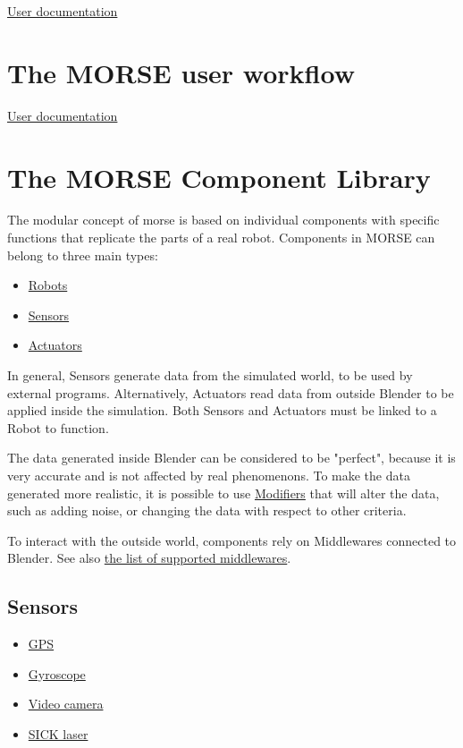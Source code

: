 \documentclass[twoside,a4paper,10pt]{report}
\newcommand{\dokutitlelevelone}[1]{\chapter{#1}}
\newcommand{\dokutitleleveltwo}[1]{\section{#1}}
\newcommand{\dokuitem}{\item}
\newcommand{\dokuquoting}{\textbar}
\begin{document}
{\dokuquoting}{\dokuquoting} \hyperref[a80da1282f2c775bbc5f2c92c836968b]{ User documentation}


\dokutitlelevelone{The MORSE user workflow}
\label{2eb6dd59bcc0f89edd80bfe2fc4bec7f}%
\label{514bac84019bd5e09c0e2b525b09f429}%
{\dokuquoting}{\dokuquoting} \hyperref[a80da1282f2c775bbc5f2c92c836968b]{ User documentation}


\dokutitlelevelone{The MORSE Component Library}
\label{1d548ae3d571b50e147fca31be425d0f}%
\label{004fdec0cc1a00c19c57e892b7eb1400}%

The modular concept of morse is based on individual components with specific functions that replicate the parts of a real robot. Components in MORSE can belong to three main types:


\begin{itemize}
\dokuitem  \hyperref[d69ac14cd721dd995822d4e984f48116]{ Robots}
\dokuitem  \hyperref[029aee483db9ae244d7a5cb353e74602]{ Sensors}
\dokuitem  \hyperref[2068e59180763f350d66a42e828e7f96]{ Actuators}
\end{itemize}

In general, Sensors generate data from the simulated world, to be used by external programs. Alternatively, Actuators read data from outside Blender to be applied inside the simulation. Both Sensors and Actuators must be linked to a Robot to function.

The data generated inside Blender can be considered to be "perfect", because it is very accurate and is not affected by real phenomenons. To make the data generated more realistic, it is possible to use \hyperref[bf24b44a8cc99e648657b164c8aba758]{ Modifiers} that will alter the data, such as adding noise, or changing the data with respect to other criteria.

To interact with the outside world, components rely on Middlewares connected to Blender. See also \hyperref[9a05db9c4b60b0527010fd997682f523]{ the list of supported middlewares}.


\dokutitleleveltwo{Sensors}
\label{029aee483db9ae244d7a5cb353e74602}%

\begin{itemize}
\dokuitem  \hyperref[11648e4e66e7ed6a86cb7f1d0cf604fe]{ GPS}
\dokuitem  \hyperref[6b3b2d8500522343e080755f0e0aa4fe]{ Gyroscope}
\dokuitem  \hyperref[dd6d2dcc679d12b9430a9787bab45b33]{ Video camera}
\dokuitem  \hyperref[8d7d5ffd0031f2449cbeaef424c22d75]{ SICK laser}
\end{itemize}
\end{document}
